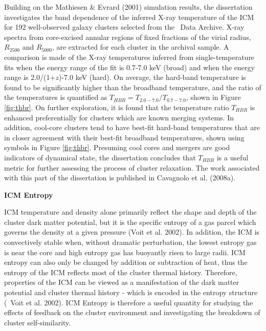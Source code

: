 \documentclass[12pt]{cv}
\begin{document}
Building on the Mathiesen \& Evrard (2001) simulation results, the
dissertation investigates the band dependence of the inferred X-ray
temperature of the ICM for 192 well-observed galaxy clusters selected
from the \chandra\ Data Archive. X-ray spectra from core-excised
annular regions of fixed fractions of the virial radius, $R_{2500}$
and $R_{5000}$, are extracted for each cluster in the archival
sample. A comparison is made of the X-ray temperatures inferred from
single-temperature fits when the energy range of the fit is 0.7-7.0
keV (broad) and when the energy range is 2.0/(1+$z$)-7.0 keV
(hard). On average, the hard-band temperature is found to be
significantly higher than the broadband temperature, and the ratio of
the temperatures is quantified as $T_{HBR} = T_{2.0-7.0}/T_{0.7-7.0}$,
shown in Figure \ref{fig:thbr}. On further exploration, it is found
that the temperature ratio $T_{HBR}$ is enhanced preferentially for
clusters which are known merging systems. In addition, cool-core
clusters tend to have best-fit hard-band temperatures that are in
closer agreement with their best-fit broadband temperatures, shown
using symbols in Figure \ref{fig:thbr}. Presuming cool cores and
mergers are good indicators of dynamical state, the dissertation
concludes that $T_{HBR}$ is a useful metric for further assessing the
process of cluster relaxation. The work associated with this part of
the dissertation is published in Cavagnolo et al. (2008a).

{\bfseries{ICM Entropy}}

ICM temperature and density alone primarily reflect the shape and
depth of the cluster dark matter potential, but it is the specific
entropy of a gas parcel which governs the density at a given pressure
(Voit et al. 2002). In addition, the ICM is convectively stable when,
without dramatic perturbation, the lowest entropy gas is near the core
and high entropy gas has buoyantly risen to large radii. ICM entropy
can also only be changed by addition or subtraction of heat, thus the
entropy of the ICM reflects most of the cluster thermal
history. Therefore, properties of the ICM can be viewed as a
manifestation of the dark matter potential and cluster thermal history
- which is encoded in the entropy structure (\eg\ Voit et
al. 2002). ICM Entropy is therefore a useful quantity for studying the
effects of feedback on the cluster environment and investigating the
breakdown of cluster self-similarity.
\end{document}
